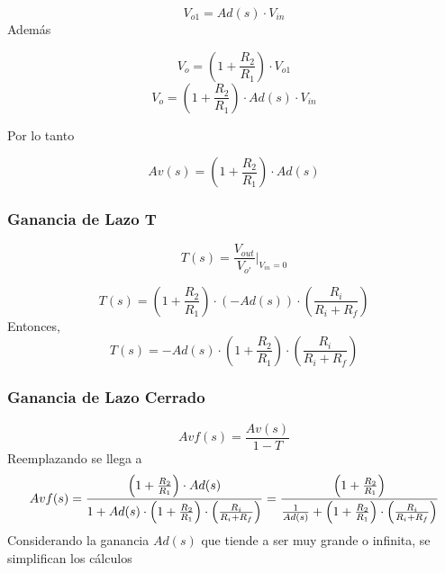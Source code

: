 \documentclass[a4paper,12pt]{article}
\begin{document}
\begin{equation}
    V_{o1} = Ad(s)\cdot V_{in} 
\end{equation}
\vspace{0,2cm}
\hspace{1mm}Además

\begin{equation}
    V_{o} = \left(1+\frac{R_2}{R_1}\right) \cdot V_{o1} 
    \end{equation}
\begin{equation}    
    V_{o} = \left(1+\frac{R_2}{R_1}\right) \cdot Ad(s) \cdot V_{in}
\end{equation}

\vspace{0,2cm}
\hspace{1mm}Por lo tanto

\begin{equation}
\boxed{Av(s) = \left(1+\frac{R_2}{R_1}\right) \cdot Ad(s)}
\end{equation}
\subsubsection {Ganancia de Lazo T}
\vspace{0,2cm}

\begin{equation}
    T(s) = \frac{V_{out}}{V_{o'}}|_{V_{in}=0}
    \end{equation}
    
\begin{equation}
    T(s) = \left(1+\frac{R_2}{R_1}\right) \cdot (-Ad(s)) \cdot \left(\frac{R_i}{R_i+R_f}\right)
\end{equation}
\vspace{0,2cm}
\hspace{1mm}Entonces,
\begin{equation}
 \boxed{T(s) = -Ad(s) \cdot \left(1+\frac{R_2}{R_1}\right) \cdot \left(\frac{R_i}{R_i+R_f}\right)}
\end{equation}

\subsubsection {Ganancia de Lazo Cerrado}
\vspace{0,2cm}
\begin{equation}
    Avf(s) = \frac{Av(s)}{1-T}
\end{equation}
\vspace{0,2cm}
\hspace{1mm}Reemplazando se llega a
\begin{equation}
     Avf(s) = \frac{\left(1+\frac{R_2}{R_1}\right) \cdot Ad(s)}{1+Ad(s) \cdot \left(1+\frac{R_2}{R_1}\right) \cdot \left(\frac{R_i}{R_i+R_f}\right)} \label{eq:primera} \\
   \nonumber
     = \frac{\left(1+\frac{R_2}{R_1}\right)}{\frac{1}{Ad(s)} + \left(1+\frac{R_2}{R_1}\right) \cdot \left(\frac{R_i}{R_i+R_f}\right)} 
\end{equation}
\vspace{0,2cm}
\hspace{1mm}Considerando la ganancia $Ad(s)$ que tiende a ser muy grande o infinita, se simplifican los cálculos
\end{document}

